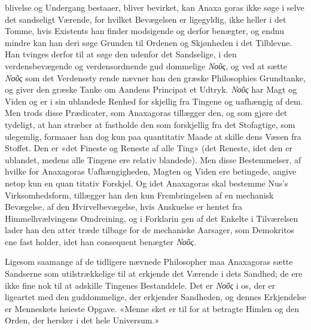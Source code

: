 \documentclass[12pt,a4paper]{book}
\newcommand{\gk}[1]{\textit{#1}}
\begin{document}
%
blivelse og Undergang bestaaer, bliver bevirket, kan Anaxa\-%
goras ikke søge i selve det sandseligt Værende, for hvilket
Bevægelsen er ligegyldig, ikke heller i det Tomme, hvis Existents
han finder modsigende og derfor benægter, og endnu mindre
kan han deri søge Grunden til Ordenen og Skjønheden i det
Tilblevne. Han tvinges derfor til at søge den udenfor det
Sandselige, i den verdensbevægende og verdensordnende gud\-%
dommelige \gk{Νοῦς}, og ved at sætte \gk{Νοῦς} som det Verdenssty\-%
rende nævner han den græske Philosophies Grundtanke, og
giver den græske Tanke om Aandens Principat et Udtryk.
\gk{Νοῦς} har Magt og Viden og er i sin ublandede Renhed for\-%
skjellig fra Tingene og uafhængig af dem. Men trods disse
Prædicater, som Anaxagoras tillægger den, og som gjøre det
tydeligt, at han stræber at fastholde den som forskjellig fra
det Stofagtige, som ulegemlig, formaaer han dog kun paa
quantitativ Maade at skille dens Væsen fra Stoffet. Den er
«det Fineste og Reneste af alle Ting» (det Reneste, idet den
er ublandet, medens alle Tingene ere relativ blandede). Men
disse Bestemmelser, af hvilke for Anaxagoras Uafhængigheden,
Magten og Viden ere betingede, angive netop kun en quan\-%
titativ Forskjel. Og idet Anaxagoras skal bestemme Nus's
Virksomhedsform, tillægger han den kun Frembringelsen af en
mechanisk Bevægelse, af den Hvirvelbevægelse, hvis Anskuelse
er hentet fra Himmelhvælvingens Omdreining, og i Forklarin\-%
gen af det Enkelte i Tilværelsen lader han den atter træde
tilbage for de mechaniske Aarsager, som Demokritos ene fast\-%
holder, idet han consequent benægter \gk{Νοῦς}.

Ligesom saamange af de tidligere nævnede Philosopher
maa Anaxagoras sætte Sandserne som utilstrækkelige til at
erkjende det Værende i dets Sandhed; de ere ikke fine nok til
at adskille Tingenes Bestanddele. Det er \gk{Νοῦς} i os, der er
ligeartet med den guddommelige, der erkjender Sandheden,
og dennes Erkjendelse er Menneskets høieste Opgave. «Menne\-%
sket er til for at betragte Himlen og den Orden, der hersker
i det hele Universum.»
\end{document}
